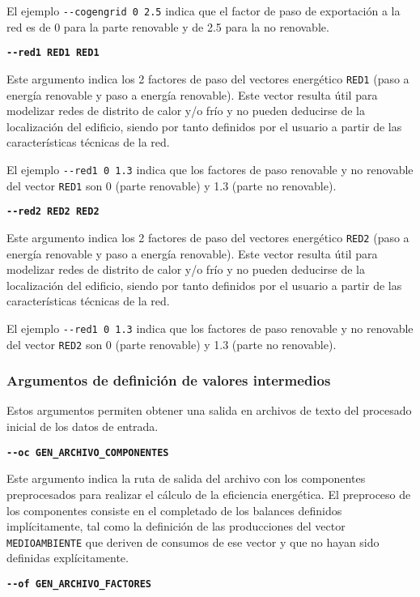 \documentclass[10pt,notitlepage,oneside,a4paper]{article}
\begin{document}
El ejemplo \texttt{-{}-cogengrid 0 2.5} indica que el factor de paso de exportación a la red es de 0 para la parte renovable y de 2.5 para la no renovable.

\textbf{\texttt{-{}-red1 RED1 RED1}}

Este argumento indica los 2 factores de paso del vectores energético \texttt{RED1} (paso a energía renovable y paso a energía renovable). Este vector resulta útil para modelizar redes de distrito de calor y/o frío y no pueden deducirse de la localización del edificio, siendo por tanto definidos por el usuario a partir de las características técnicas de la red.

El ejemplo \texttt{-{}-red1 0 1.3} indica que los factores de paso renovable y no renovable del vector \texttt{RED1} son 0 (parte renovable) y 1.3 (parte no renovable).

\textbf{\texttt{-{}-red2 RED2 RED2}}

Este argumento indica los 2 factores de paso del vectores energético \texttt{RED2} (paso a energía renovable y paso a energía renovable). Este vector resulta útil para modelizar redes de distrito de calor y/o frío y no pueden deducirse de la localización del edificio, siendo por tanto definidos por el usuario a partir de las características técnicas de la red.

El ejemplo \texttt{-{}-red1 0 1.3} indica que los factores de paso renovable y no renovable del vector \texttt{RED2} son 0 (parte renovable) y 1.3 (parte no renovable).

\subsubsection{Argumentos de definición de valores intermedios}

Estos argumentos permiten obtener una salida en archivos de texto del procesado inicial de los datos de entrada.

\textbf{\texttt{-{}-oc GEN\_ARCHIVO\_COMPONENTES}}

Este argumento indica la ruta de salida del archivo con los componentes preprocesados para realizar el cálculo de la eficiencia energética. El preproceso de los componentes consiste en el completado de los balances definidos implícitamente, tal como la definición de las producciones del vector \texttt{MEDIOAMBIENTE} que deriven de consumos de ese vector y que no hayan sido definidas explícitamente.

\textbf{\texttt{-{}-of GEN\_ARCHIVO\_FACTORES}}
\end{document}
